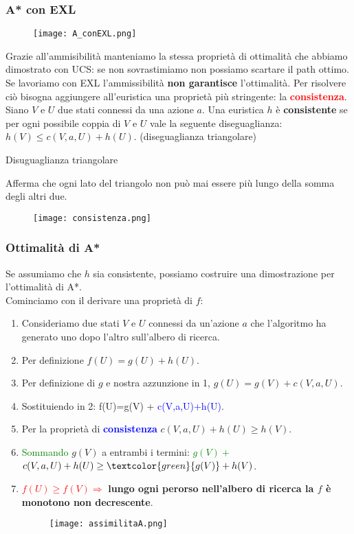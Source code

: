 \documentclass{article}
\begin{document}
\subsubsection{A* con EXL}
\begin{figure}[H]
    \centering
    \texttt{[image: A\_conEXL.png]}
\end{figure}
Grazie all'ammisibilità manteniamo la stessa proprietà di ottimalità che abbiamo dimostrato con UCS: se non sovrastimiamo non possiamo scartare il path ottimo. \\
Se lavoriamo con EXL l'ammissibilità \textbf{non garantisce} l'ottimalità. Per risolvere ciò bisogna aggiungere all'euristica una proprietà più stringente: la \textcolor{red}{\textbf{consistenza}}.
\\ Siano $V$ e $U$ due stati connessi da una azione $a$. Una euristica $h$ è \textbf{consistente} se per ogni possibile coppia di $V$ e $U$ vale la seguente diseguaglianza: $h(V) \leq c(V, a, U)+h(U)$. (diseguaglianza triangolare)
\\
\begin{frame}{Disuguaglianza triangolare}
\end{frame}
Afferma che ogni lato del triangolo non può mai essere più lungo della somma degli altri due. 
\begin{figure}[H]
    \centering
    \texttt{[image: consistenza.png]}
\end{figure}
\subsubsection{Ottimalità di A*}
Se assumiamo che $h$ sia consistente, possiamo costruire una dimostrazione per l'ottimalità di A*. \\ Cominciamo con il derivare una proprietà di $f$:
\begin{enumerate}
    \item Consideriamo due stati $V$ e $U$ connessi da un'azione $a$ che l'algoritmo ha generato uno dopo l'altro sull'albero di ricerca.
    \item Per definizione $f(U)=g(U)+h(U)$.
    \item Per definizione di $g$ e nostra azzunzione in 1, $g(U)=g(V) + c(V,a,U)$.
    \item Sostituiendo in 2: f(U)=g(V) + \textcolor{blue}{c(V,a,U)+h(U)}.
    \item Per la proprietà di \textcolor{blue}{\textbf{consistenza}} $c(V,a,U)+h(U) \geq h(V)$.
    \item \textcolor{green}{Sommando} $g(V)$ a entrambi i termini: \textcolor{green}{$g(V)+$} $c(V,a,U)+h(U) \geq \textcolor{green}{g(V)}+ h(V)$.
    \item \textcolor{red}{\textbf{$f(U) \geq f(V) \Rightarrow$}} \textbf{lungo ogni perorso nell'albero di ricerca la $f$ è monotono non decrescente}.
    \begin{figure}[H]
        \centering
        \texttt{[image: assimilitaA.png]}
    \end{figure}
\end{enumerate}
\end{document}
